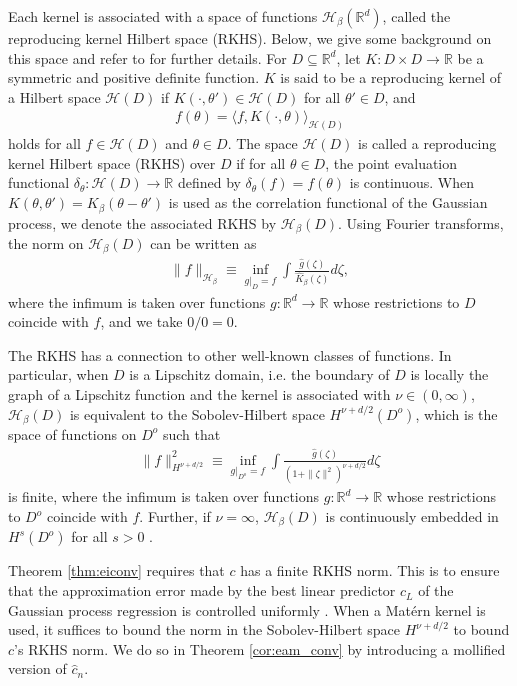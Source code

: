 \documentclass[letterpaper,11pt]{article}
\theoremstyle{myplain}
\theoremstyle{mydefinition}
\theoremstyle{myremark}
\renewcommand{\cite}{\citet}
\numberwithin{equation}{section}
\numberwithin{figure}{section}
\begin{document}
\begin{appendices}
Each kernel is associated with a space of functions $\mathcal H_\beta(\mathbb R^d)$, called the reproducing kernel Hilbert space (RKHS). Below, we give some background on this space and refer to \cite{Steinwart:2008aa,Vaart:2008aa} for further details. 
For $D\subseteq \mathbb R^d$, let $K:D\times D\to\mathbb R$ be a symmetric and positive definite function. $K$ is said to be a reproducing kernel of a Hilbert space $\mathcal H(D)$ if $K(\cdot,\theta')\in \mathcal H(D)$ for all $\theta'\in D$, and
\begin{align*}
f(\theta)=\langle f,K(\cdot,\theta)\rangle_{\mathcal H(D)}
\end{align*}
holds for all $f\in\mathcal H(D)$ and $\theta\in D$. The space $\mathcal H(D)$ is called a reproducing kernel Hilbert space (RKHS) over $D$ if for all $\theta\in D$, the point evaluation functional $\delta_\theta:\mathcal H(D)\to\mathbb R$ defined by $\delta_\theta(f)=f(\theta)$ is continuous. When  $K(\theta,\theta')=K_\beta(\theta-\theta')$ is used as the correlation functional of the Gaussian process, we denote the associated RKHS by $\mathcal H_\beta(D)$.
Using Fourier transforms, the norm on $\mathcal H_\beta(D)$ can be written as
\begin{align}
\|f\|_{\mathcal H_\beta}\equiv \inf_{g|_D=f}\int \frac{\hat g(\zeta)}{\hat K_\beta(\zeta)}d\zeta,	
\end{align}
where  the infimum is taken over functions $g:\mathbb R^d\to\mathbb R$ whose restrictions to $D$ coincide with $f$, and we take $0/0=0$.

The RKHS has a connection to other well-known classes of functions. In particular, when $D$ is a Lipschitz domain, i.e. the boundary of $D$ is locally the graph of a Lipschitz function \citep[][]{Tartar:2007aa} and the kernel is associated with $\nu\in (0,\infty)$,
  $\mathcal H_\beta(D)$ is equivalent to the Sobolev-Hilbert space $H^{\nu+d/2}(D^o)$, which is the space of functions on $D^o$ such that
  \begin{align}
\|f\|^2_{H^{\nu+d/2}}\equiv\inf_{g|_{D^o}=f}\int \frac{\hat g(\zeta)}{(1+\|\zeta\|^2)^{\nu+d/2}}d\zeta	
  \end{align} 
  is finite, where the infimum is taken over functions $g:\mathbb R^d\to\mathbb R$ whose restrictions to $D^o$ coincide with $f$.
  Further, if $\nu=\infty$, $\mathcal H_\beta(D)$ is continuously embedded in $H^{s}(D^o)$ for all $s>0$ \citep[][Lemma 3]{Bull_Convergence_2011}.

Theorem \ref{thm:eiconv} requires that $c$ has a finite RKHS norm. 
This is to ensure that the approximation error made by the best linear predictor  $c_L$ of the Gaussian process regression is controlled uniformly \citep{Narcowich_Refined_2003}.
When a Mat\'{e}rn kernel is used, it suffices to bound the norm in the Sobolev-Hilbert space $H^{\nu+d/2}$ to bound $c$'s RKHS norm. We do so in Theorem \ref{cor:eam_conv} by introducing a mollified version of $\hat c_n$.


\end{appendices}
\end{document}
